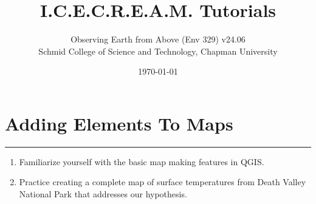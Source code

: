 \documentclass[oneside,a4paper,11pt,explicit]{book}
\title{I.C.E.C.R.E.A.M. Tutorials}
\subtitle{\small Observing Earth from Above (Env 329) v24.06 \\
	\small Schmid College of Science and Technology, Chapman University}
\date{\today}
\begin{document}
\dominitoc

\faketableofcontents

\setcounter{chapter}{6} %

\chapter{Adding Elements To Maps} %

\vspace{-2em}

\minitoc

\hrule

\vspace{1em}

\begin{tcolorbox}[enhanced,frame style image=blueshade.png,
	opacityback=0.75,opacitybacktitle=0.25,
	colback=blue!5!white,colframe=blue!75!black,title={\Large \textbf{Objectives:}}]
	\large
	\begin{enumerate}
		\item Familiarize yourself with the basic map making features in QGIS.
		\item Practice creating a complete map of surface temperatures from Death Valley National Park that addresses our hypothesis. 
	\end{enumerate}
\end{tcolorbox}

\clearpage
\end{document}

